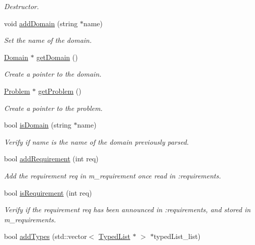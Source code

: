 \begin{DoxyCompactItemize}
\begin{DoxyCompactList}\small\item\em Destructor. \end{DoxyCompactList}\item 
void \hyperlink{classData_adcab26af5124ec74d78fe287d5fe230b}{add\+Domain} (string $\ast$name)
\begin{DoxyCompactList}\small\item\em Set the name of the domain. \end{DoxyCompactList}\item 
\hyperlink{classDomain}{Domain} $\ast$ \hyperlink{classData_ab089c7118ff881bb68aea9219bf3ce71}{get\+Domain} ()
\begin{DoxyCompactList}\small\item\em Create a pointer to the domain. \end{DoxyCompactList}\item 
\hyperlink{classProblem}{Problem} $\ast$ \hyperlink{classData_aec1aab3dbf34f208145f9a5998b0361a}{get\+Problem} ()
\begin{DoxyCompactList}\small\item\em Create a pointer to the problem. \end{DoxyCompactList}\item 
bool \hyperlink{classData_ab1bf9174e79a11a839b4c20638e900b4}{is\+Domain} (string $\ast$name)
\begin{DoxyCompactList}\small\item\em Verify if name is the name of the domain previously parsed. \end{DoxyCompactList}\item 
bool \hyperlink{classData_ab7776fd08b027d7fe13aef078074c1c3}{add\+Requirement} (int req)
\begin{DoxyCompactList}\small\item\em Add the requirement req in m\+\_\+requirement once read in \+:requirements. \end{DoxyCompactList}\item 
bool \hyperlink{classData_a7b65c60ee62668bac343e4d375f5e6d0}{is\+Requirement} (int req)
\begin{DoxyCompactList}\small\item\em Verify if the requirement req has been announced in \+:requirements, and stored in m\+\_\+requirements. \end{DoxyCompactList}\item 
bool \hyperlink{classData_a7ad500e35daba61a234d65036b313daf}{add\+Types} (std\+::vector$<$ \hyperlink{classTypedList}{Typed\+List} $\ast$ $>$ $\ast$typed\+List\+\_\+list)

\end{DoxyCompactItemize}
